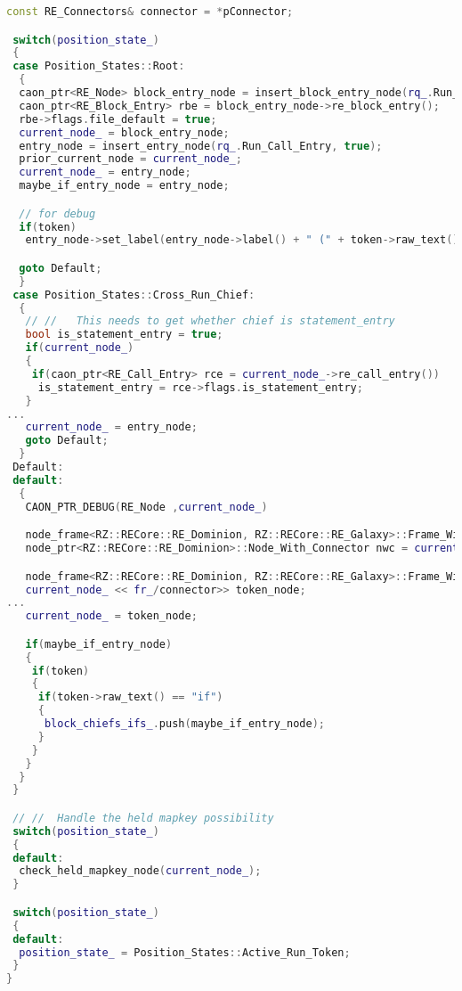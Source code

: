 \begin{lstlisting}[language = C++, numbers = none, escapechar = !,
    basicstyle = \ttfamily\bfseries\scriptsize, linewidth = .9\linewidth]
 const RE_Connectors& connector = *pConnector;

 switch(position_state_)
 {
 case Position_States::Root:
  {
  caon_ptr<RE_Node> block_entry_node = insert_block_entry_node(rq_.Run_Block_Entry);
  caon_ptr<RE_Block_Entry> rbe = block_entry_node->re_block_entry();
  rbe->flags.file_default = true;
  current_node_ = block_entry_node;
  entry_node = insert_entry_node(rq_.Run_Call_Entry, true);
  prior_current_node = current_node_;
  current_node_ = entry_node;
  maybe_if_entry_node = entry_node;

  // for debug
  if(token)
   entry_node->set_label(entry_node->label() + " (" + token->raw_text() + ")");

  goto Default;
  }
 case Position_States::Cross_Run_Chief:
  {
   // //   This needs to get whether chief is statement_entry
   bool is_statement_entry = true;
   if(current_node_)
   {
    if(caon_ptr<RE_Call_Entry> rce = current_node_->re_call_entry())
     is_statement_entry = rce->flags.is_statement_entry;
   }
...
   current_node_ = entry_node;
   goto Default;
  }
 Default:
 default:
  {
   CAON_PTR_DEBUG(RE_Node ,current_node_)

   node_frame<RZ::RECore::RE_Dominion, RZ::RECore::RE_Galaxy>::Frame_With_Connector fwc = fr_/connector;
   node_ptr<RZ::RECore::RE_Dominion>::Node_With_Connector nwc = current_node_ << fwc;

   node_frame<RZ::RECore::RE_Dominion, RZ::RECore::RE_Galaxy>::Frame_With_Connector fwc1 = nwc.frame_with_connector;
   current_node_ << fr_/connector>> token_node;
...
   current_node_ = token_node;

   if(maybe_if_entry_node)
   {
    if(token)
    {
     if(token->raw_text() == "if")
     {
      block_chiefs_ifs_.push(maybe_if_entry_node);
     }
    }
   }
  }
 }

 // //  Handle the held mapkey possibility
 switch(position_state_)
 {
 default:
  check_held_mapkey_node(current_node_);
 }

 switch(position_state_)
 {
 default:
  position_state_ = Position_States::Active_Run_Token;
 }
}


\end{lstlisting}
